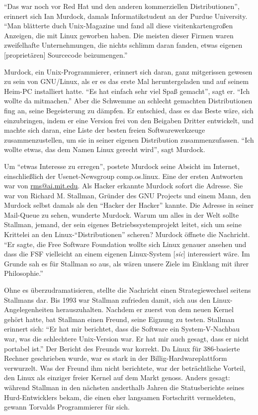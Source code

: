 "`Das war noch vor Red Hat und den anderen kommerziellen Distributionen"', erinnert sich Ian Murdock, damals Informatikstudent an der Purdue University. "`Man blätterte duch Unix-Magazine und fand all diese visitenkartengroßen Anzeigen, die mit \glq Linux \grq geworben haben. Die meisten dieser Firmen waren zweifelhafte Unternehmungen, die nichts schlimm daran fanden, etwas eigenen [proprietären] Sourcecode beizumengen."'

Murdock, ein Unix-Programmierer, erinnert sich daran, ganz mitgerissen gewesen zu sein von GNU/Linux, als er es das erste Mal heruntergeladen und auf seinem Heim-PC installiert hatte. "`Es hat einfach sehr viel Spaß gemacht"', sagt er. "`Ich wollte da mitmachen."' Aber die Schwemme an schlecht gemachten Distributionen fing an, seine Begeisterung zu dämpfen. Er entschied, dass es das Beste wäre, sich einzubringen, indem er eine Version frei von den Beigaben Dritter entwickelt, und machte sich daran, eine Liste der besten freien Softwarewerkzeuge zusammenzustellen, um sie in seiner eigenen Distribution zusammenzufassen. "`Ich wollte etwas, das dem Namen Linux gerecht wird"', sagt Murdock. 

Um "`etwas Interesse zu erregen"', postete Murdock seine Absicht im Internet, einschließlich der Usenet-Newsgroup comp.os.linux. Eine der ersten Antworten war von \href{mailto:rms@ai.mit.edu}{rms@ai.mit.edu}. Als Hacker erkannte Murdock sofort die Adresse. Sie war von Richard M. Stallman, Gründer des GNU Projects und einem Mann, den Murdock selbst damals als den "`Hacker der Hacker"' kannte. Die Adresse in seiner Mail-Queue zu sehen, wunderte Murdock. Warum um alles in der Welt sollte Stallman, jemand, der sein eigenes Betriebssystemprojekt leitet, sich um seine Krittelei an den Linux-"`Distributionen"' scheren?
Murdock öffnete die Nachricht. "`Er sagte, die Free Software Foundation wollte sich Linux genauer ansehen und dass die FSF vielleicht an einem eigenen Linux-System [\textit{sic}] interessiert wäre. Im Grunde sah es für Stallman so aus, als wären unsere Ziele im Einklang mit ihrer Philosophie."'

Ohne es überzudramatisieren, stellte die Nachricht einen Strategiewechsel seitens Stallmans dar. Bis 1993 war Stallman zufrieden damit, sich aus den Linux-Angelegenheiten herauszuhalten. Nachdem er zuerst von dem neuen Kernel gehört hatte, bat Stallman einen Freund, seine Eignung zu testen. Stallman erinnert sich: "`Er hat mir berichtet, dass die Software ein System-V-Nachbau war, was die schlechtere Unix-Version war. Er hat mir auch gesagt, dass er nicht portabel ist."'
Der Bericht des Freunds war korrekt. Da Linux für 386-basierte Rechner geschrieben wurde, war es stark in der Billig-Hardwareplattform verwurzelt.
Was der Freund ihm nicht berichtete, war der beträchtliche Vorteil, den Linux als einziger freier Kernel auf dem Markt genoss. Anders gesagt: während Stallman in den nächsten anderthalb Jahren die Statusberichte seines Hurd-Entwicklers bekam, die einen eher langsamen Fortschritt vermeldeten, gewann Torvalds Programmierer für sich.

